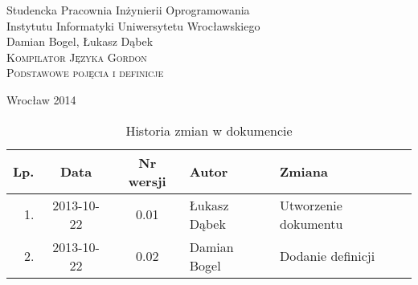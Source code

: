 \documentclass{documentation}
\begin{document}
\begin{titlepage}
\begin{center}
Studencka Pracownia Inżynierii Oprogramowania\\
Instytutu Informatyki Uniwersytetu Wrocławskiego\\[6cm]

Damian Bogel, Łukasz Dąbek\\[1cm]
\textsc{\LARGE Kompilator Języka Gordon}\\[0.5cm]
\textsc{\large Podstawowe pojęcia i definicje}

\vfill
Wrocław 2014 \\[2.5cm]

\end{center}
\end{titlepage}

\newpage
\begin{table}
	\centering
    \captionsetup{name=Tabela}
	\caption{Historia zmian w dokumencie}
		\begin{tabular}{|r|c|c|l|l|}
		\hline
		Lp.  & Data       & Nr wersji & Autor                 & Zmiana \\ \hline
		1.   & 2013-10-22 & 0.01 & Łukasz Dąbek & Utworzenie dokumentu \\ \hline
        2.   & 2013-10-22 & 0.02 & Damian Bogel & Dodanie definicji \\ \hline
	\end{tabular}
\end{table}
\newpage

\tableofcontents
\setcounter{page}{2}

\newpage
\end{document}
